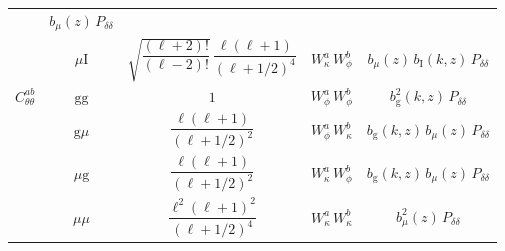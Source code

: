 \begin{table}[!htbp]
\begin{tabular}{c c c c c}
& \(b_\mu(z)\,P_{\delta\delta}\)
\\
& \(\mu\mathrm{I}\)
& \(\sqrt{\dfrac{(\ell+2)!}{(\ell-2)!}}\,\dfrac{\ell(\ell+1)}{(\ell+1/2)^4}\)
& \(W_\kappa^a \, W_\phi^b\)
& \(b_\mu(z)\,b_\mathrm{I}(k,z)\,P_{\delta\delta}\)
\\
\hline
\(C_{\theta\theta}^{ab}\)
& \(\mathrm{g}\mathrm{g}\)
& \(1\)
& \(W_\phi^a \, W_\phi^b\)
& \(b_\mathrm{g}^2(k,z)\,P_{\delta\delta}\)
\\
& \(\mathrm{g}\mu\)
& \(\dfrac{\ell(\ell+1)}{(\ell+1/2)^2}\)
& \(W_\phi^a \, W_\kappa^b\)
& \(b_\mathrm{g}(k,z)\,b_\mu(z)\,P_{\delta\delta}\)
\\
& \(\mu\mathrm{g}\)
& \(\dfrac{\ell(\ell+1)}{(\ell+1/2)^2}\)
& \(W_\kappa^a \, W_\phi^b\)
& \(b_\mathrm{g}(k,z)\,b_\mu(z)\,P_{\delta\delta}\)
\\
& \(\mu\mu\)
& \(\dfrac{\ell^2(\ell+1)^2}{(\ell+1/2)^4}\)
& \(W_\kappa^a \, W_\kappa^b\)
& \(b_\mu^2(z)\,P_{\delta\delta}\)
\\
\hline\hline
\end{tabular}
\end{table}
